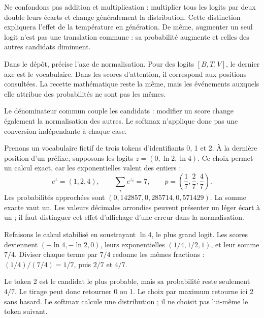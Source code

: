 Ne confondons pas addition et multiplication : multiplier tous
les logits par deux double leurs écarts et change généralement
la distribution. Cette distinction expliquera l'effet de la
température en génération. De même, augmenter un seul logit
n'est pas une translation commune : sa probabilité augmente
et celles des autres candidats diminuent.

Dans le dépôt,  précise l'axe de normalisation.
Pour des logits \([B,T,V]\), le dernier axe est le vocabulaire.
Dans les scores d'attention, il correspond aux positions consultées.
La recette mathématique reste la même, mais les événements
auxquels elle attribue des probabilités ne sont pas les mêmes.

Le dénominateur commun couple les candidats : modifier un score
change également la normalisation des autres. Le softmax n'applique
donc pas une conversion indépendante à chaque case.



Prenons un vocabulaire fictif de trois tokens d'identifiants
0, 1 et 2. À la dernière position d'un préfixe, supposons
les logits \(z=(0,\ln2,\ln4)\). Ce choix permet un calcul
exact, car les exponentielles valent des entiers :
\[
 e^z=(1,2,4),\qquad
 \sum_i e^{z_i}=7,\qquad
 p=\left(\frac17,\frac27,\frac47\right).
\]
Les probabilités approchées sont
\((0{,}142857,0{,}285714,0{,}571429)\).
La somme exacte vaut un. Les valeurs décimales arrondies
peuvent présenter un léger écart à un ; il faut distinguer
cet effet d'affichage d'une erreur dans la normalisation.

Refaisons le calcul stabilisé en soustrayant \(\ln4\),
le plus grand logit. Les scores deviennent
\((-\ln4,-\ln2,0)\), leurs exponentielles
\((1/4,1/2,1)\), et leur somme \(7/4\).
Diviser chaque terme par \(7/4\) redonne les mêmes
fractions : \((1/4)/(7/4)=1/7\), puis \(2/7\) et \(4/7\).

Le token 2 est le candidat le plus probable, mais sa probabilité
reste seulement \(4/7\). Le tirage peut donc retourner 0 ou 1.
Le choix par maximum retourne ici 2 sans hasard.
Le softmax calcule une distribution ; il ne choisit pas lui-même
le token suivant.

